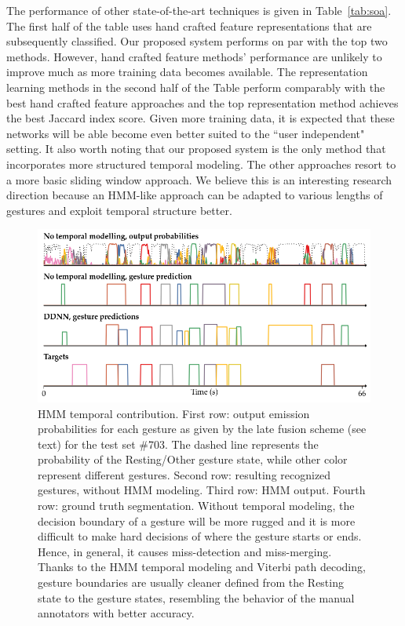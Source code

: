 The performance of other state-of-the-art techniques is given in Table~\ref{tab:soa}. The first half of the table uses hand crafted feature representations that are subsequently classified. Our proposed system performs on par with the top two methods. However, hand crafted feature methods' performance are unlikely to improve much as more training data becomes available. The representation learning methods in the second half of the Table perform comparably with the best hand crafted feature approaches and the top representation method achieves the best Jaccard index score. Given more training data, it is expected that these networks will be able become even better suited to the ``user independent" setting. It also worth noting that our proposed system is the only method that incorporates more structured temporal modeling. The other approaches resort to a more basic sliding window approach. We believe this is an interesting research direction because an HMM-like approach can be adapted to various lengths of gestures and exploit temporal structure better.

%


\begin{figure}[t]
  \centering
  \includegraphics[width=.7\textwidth]{images/output.png}
  \caption{
  \small{HMM temporal contribution.
First row: output emission probabilities for each gesture as given by the late fusion scheme (see text) for the test set \#703.
The dashed line represents the probability of the Resting/Other gesture state,
while other color represent different gestures.
Second row: resulting recognized gestures, without HMM modeling.
Third row: HMM output.
Fourth row: ground truth segmentation.
%
Without temporal modeling, the decision boundary of a gesture will be more rugged and it is more difficult to make
hard decisions of where the gesture starts or ends. Hence, in general,
it causes miss-detection and miss-merging.
%
Thanks to the HMM temporal modeling and Viterbi path decoding, gesture boundaries
are usually cleaner defined from the Resting state to the gesture states,
resembling the behavior of the manual annotators with better accuracy.
}
}
    \label{fig:temporalModellingComparision}
\end{figure}


